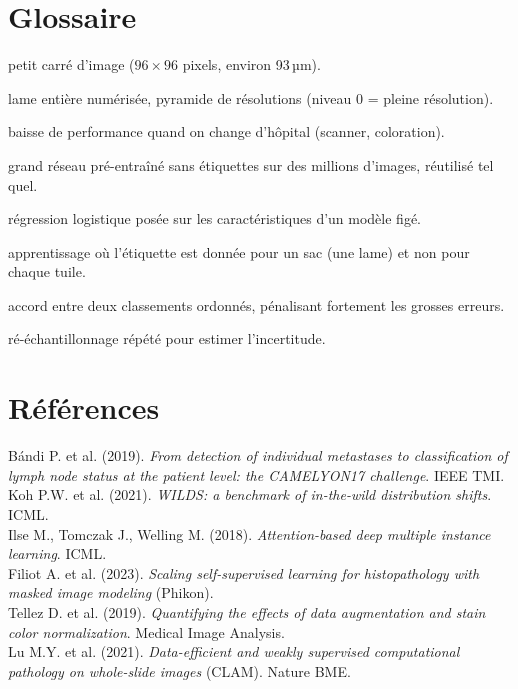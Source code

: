 \documentclass[11pt,a4paper]{article}
\begin{document}
\section*{Glossaire}
\begin{description}[leftmargin=3.2cm, style=sameline, font=\bfseries]
  \item[Patch / tuile] petit carré d'image ($96\times96$ pixels, environ 93\,µm).
  \item[WSI] lame entière numérisée, pyramide de résolutions (niveau 0 = pleine résolution).
  \item[Changement de domaine] baisse de performance quand on change d'hôpital (scanner, coloration).
  \item[Modèle de fondation] grand réseau pré-entraîné sans étiquettes sur des millions d'images, réutilisé tel quel.
  \item[Sonde linéaire] régression logistique posée sur les caractéristiques d'un modèle figé.
  \item[MIL / ABMIL] apprentissage où l'étiquette est donnée pour un sac (une lame) et non pour chaque tuile.
  \item[Kappa quadratique] accord entre deux classements ordonnés, pénalisant fortement les grosses erreurs.
  \item[Bootstrap] ré-échantillonnage répété pour estimer l'incertitude.
\end{description}

\section*{Références}
\small
Bándi P. et al. (2019). \emph{From detection of individual metastases to classification of lymph node status at the patient level:
the CAMELYON17 challenge}. IEEE TMI.\\
Koh P.W. et al. (2021). \emph{WILDS: a benchmark of in-the-wild distribution shifts}. ICML.\\
Ilse M., Tomczak J., Welling M. (2018). \emph{Attention-based deep multiple instance learning}. ICML.\\
Filiot A. et al. (2023). \emph{Scaling self-supervised learning for histopathology with masked image modeling} (Phikon).\\
Tellez D. et al. (2019). \emph{Quantifying the effects of data augmentation and stain color normalization}. Medical Image Analysis.\\
Lu M.Y. et al. (2021). \emph{Data-efficient and weakly supervised computational pathology on whole-slide images} (CLAM). Nature BME.
\end{document}
